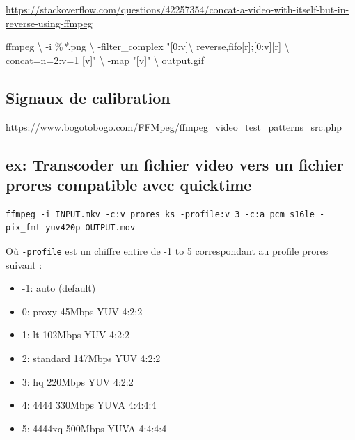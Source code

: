 \documentclass[
  french,
]{book}
\newenvironment{Shaded}{\begin{snugshade}}{\end{snugshade}}
\newcommand{\DataTypeTok}[1]{\textcolor[rgb]{0.13,0.29,0.53}{#1}}
\newcommand{\ExtensionTok}[1]{#1}
\newcommand{\NormalTok}[1]{#1}
\newcommand{\PreprocessorTok}[1]{\textcolor[rgb]{0.56,0.35,0.01}{\textit{#1}}}
\newcommand{\StringTok}[1]{\textcolor[rgb]{0.31,0.60,0.02}{#1}}
\providecommand{\tightlist}{%
  \setlength{\itemsep}{0pt}\setlength{\parskip}{0pt}}
\begin{document}
\url{https://stackoverflow.com/questions/42257354/concat-a-video-with-itself-but-in-reverse-using-ffmpeg}

\begin{Shaded}
\begin{Highlighting}[]
\ExtensionTok{ffmpeg} \DataTypeTok{\textbackslash{}}
\NormalTok{{-}i \%}\PreprocessorTok{*}\NormalTok{.png }\DataTypeTok{\textbackslash{}}
\NormalTok{{-}filter\_complex }\StringTok{"[0:v]}\DataTypeTok{\textbackslash{}}
\StringTok{reverse,fifo[r];[0:v][r] }\DataTypeTok{\textbackslash{}}
\StringTok{concat=n=2:v=1 [v]"} \DataTypeTok{\textbackslash{}}
\NormalTok{{-}map }\StringTok{"[v]"} \DataTypeTok{\textbackslash{}}
\NormalTok{output.gif}
\end{Highlighting}
\end{Shaded}

\hypertarget{signaux-de-calibration}{%
\subsection{Signaux de calibration}\label{signaux-de-calibration}}

\url{https://www.bogotobogo.com/FFMpeg/ffmpeg_video_test_patterns_src.php}

\hypertarget{ex-transcoder-un-fichier-video-vers-un-fichier-prores-compatible-avec-quicktime}{%
\subsection{ex: Transcoder un fichier video vers un fichier prores compatible avec quicktime}\label{ex-transcoder-un-fichier-video-vers-un-fichier-prores-compatible-avec-quicktime}}

\begin{verbatim}
ffmpeg -i INPUT.mkv -c:v prores_ks -profile:v 3 -c:a pcm_s16le -pix_fmt yuv420p OUTPUT.mov
\end{verbatim}

Où \texttt{-profile} est un chiffre entire de -1 to 5 correspondant au profile prores suivant :

\begin{itemize}
\tightlist
\item
  -1: auto (default)
\item
  0: proxy 45Mbps YUV 4:2:2
\item
  1: lt 102Mbps YUV 4:2:2
\item
  2: standard 147Mbps YUV 4:2:2
\item
  3: hq 220Mbps YUV 4:2:2
\item
  4: 4444 330Mbps YUVA 4:4:4:4
\item
  5: 4444xq 500Mbps YUVA 4:4:4:4
\end{itemize}
\end{document}
